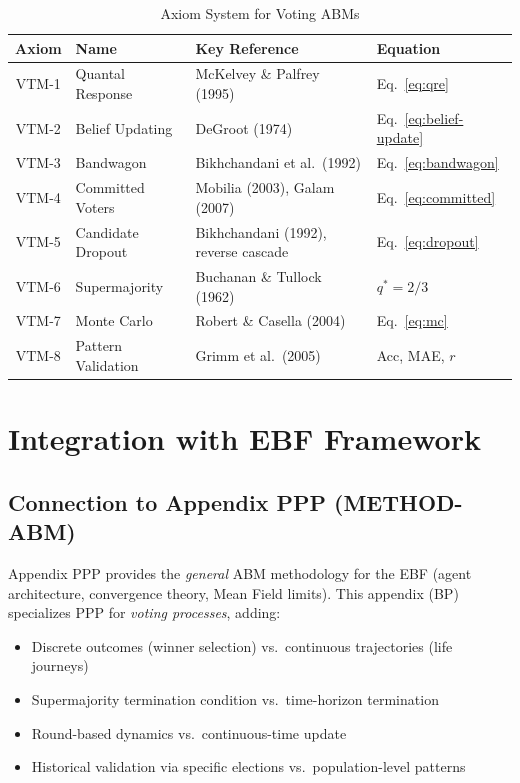 \begin{table}[htbp]
\centering
\caption{Axiom System for Voting ABMs}
\label{tab:bp-axioms}
\renewcommand{\arraystretch}{1.3}
\small
\begin{tabular}{@{}clll@{}}
\toprule
\textbf{Axiom} & \textbf{Name} & \textbf{Key Reference} & \textbf{Equation} \\
\midrule
VTM-1 & Quantal Response & McKelvey \& Palfrey (1995) & Eq.~\eqref{eq:qre} \\
VTM-2 & Belief Updating  & DeGroot (1974) & Eq.~\eqref{eq:belief-update} \\
VTM-3 & Bandwagon & Bikhchandani et al.\ (1992) & Eq.~\eqref{eq:bandwagon} \\
VTM-4 & Committed Voters & Mobilia (2003), Galam (2007) & Eq.~\eqref{eq:committed} \\
VTM-5 & Candidate Dropout & Bikhchandani (1992), reverse cascade & Eq.~\eqref{eq:dropout} \\
VTM-6 & Supermajority & Buchanan \& Tullock (1962) & $q^* = 2/3$ \\
VTM-7 & Monte Carlo & Robert \& Casella (2004) & Eq.~\eqref{eq:mc} \\
VTM-8 & Pattern Validation & Grimm et al.\ (2005) & Acc, MAE, $r$ \\
\bottomrule
\end{tabular}
\end{table}


\section{Integration with EBF Framework}
\label{sec:bp-integration}

\subsection{Connection to Appendix PPP (METHOD-ABM)}

Appendix PPP provides the \emph{general} ABM methodology for the EBF (agent architecture,
convergence theory, Mean Field limits). This appendix (BP) specializes PPP for
\emph{voting processes}, adding:

\begin{itemize}[nosep]
\item Discrete outcomes (winner selection) vs.\ continuous trajectories (life journeys)
\item Supermajority termination condition vs.\ time-horizon termination
\item Round-based dynamics vs.\ continuous-time update
\item Historical validation via specific elections vs.\ population-level patterns
\end{itemize}

